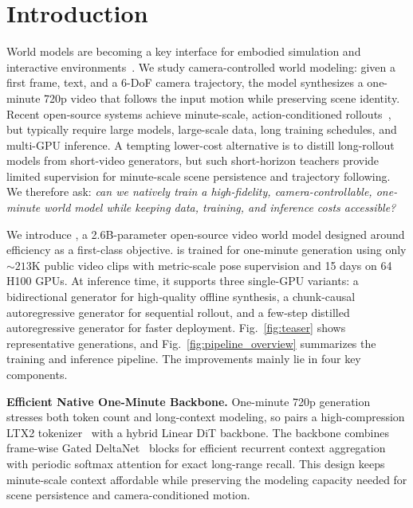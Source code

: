 \section{Introduction}
\label{sec:introduction}

World models are becoming a key interface for embodied simulation and interactive environments~\citep{world_models,genie3,gaia1,dreamdojo,aether,hy_worldplay,lingbot_world,infinite_world}.
We study camera-controlled world modeling: given a first frame, text, and a 6-DoF camera trajectory, the model synthesizes a one-minute 720p video that follows the input motion while preserving scene identity.
Recent open-source systems achieve minute-scale, action-conditioned rollouts~\citep{infinite_world,matrixgame3,lingbot_world,hy_worldplay}, but typically require large models, large-scale data, long training schedules, and multi-GPU inference.
A tempting lower-cost alternative is to distill long-rollout models from short-video generators, but such short-horizon teachers provide limited supervision for minute-scale scene persistence and trajectory following.
We therefore ask: \textit{can we natively train a high-fidelity, camera-controllable, one-minute world model while keeping data, training, and inference costs accessible?}

\noindent We introduce \modelname, a 2.6B-parameter open-source video world model designed around efficiency as a first-class objective.
\modelname is trained for one-minute generation using only ${\sim}213$K public video clips with metric-scale pose supervision and 15 days on 64 H100 GPUs.
At inference time, it supports three single-GPU variants: a bidirectional generator for high-quality offline synthesis, a chunk-causal autoregressive generator for sequential rollout, and a few-step distilled autoregressive generator for faster deployment.
Fig.~\ref{fig:teaser} shows representative generations, and Fig.~\ref{fig:pipeline_overview} summarizes the training and inference pipeline.
The improvements mainly lie in four key components.

\noindent\textbf{Efficient Native One-Minute Backbone.}
One-minute 720p generation stresses both token count and long-context modeling, so \modelname pairs a high-compression LTX2 tokenizer~\citep{ltx2} with a hybrid Linear DiT backbone.
The backbone combines frame-wise Gated DeltaNet~\citep{gated_deltanet} blocks for efficient recurrent context aggregation with periodic softmax attention for exact long-range recall.
This design keeps minute-scale context affordable while preserving the modeling capacity needed for scene persistence and camera-conditioned motion.

